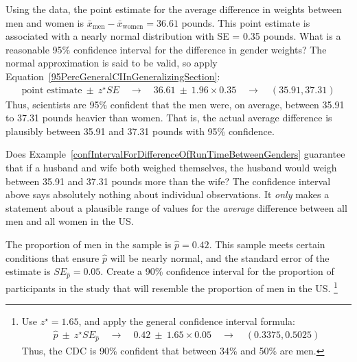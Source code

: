 \begin{example}{Using the  data, the point estimate for the average difference in weights between men and women is $\bar{x}_\mathrm{{men}}-\bar{x}_\mathrm{{women}}= 36.61$ pounds. This point estimate is associated with a nearly normal distribution with SE = 0.35 pounds. What is a reasonable 95\% confidence interval for the difference in gender weights?}
\label{confIntervalForDifferenceOfRunTimeBetweenGenders}
The normal approximation is said to be valid, so apply Equation~\eqref{95PercGeneralCIInGeneralizingSection}:
\begin{eqnarray*}
\text{point estimate}\ \pm\ z^{\star} SE
	\quad\rightarrow\quad 36.61\ \pm\ 1.96\times 0.35
	\quad\rightarrow\quad (35.91, 37.31)
\end{eqnarray*}
Thus, scientists are 95\% confident that the men were, on average, between 35.91 to 37.31 pounds heavier than women. That is, the actual average difference is plausibly between 35.91 and 37.31 pounds with 95\% confidence.
\end{example}

\begin{example}{Does Example~\ref{confIntervalForDifferenceOfRunTimeBetweenGenders} guarantee that if a husband and wife both weighed themselves, the husband would weigh between 35.91 and 37.31 pounds more than the wife?}
The confidence interval above says absolutely nothing about individual observations. It \emph{only} makes a statement about a plausible range of values for the \emph{average} difference between all men and all women in the US. 
\end{example}

\begin{exercise}
The proportion of men in the  sample is $\hat{p}=0.42$. This sample meets certain conditions that ensure $\hat{p}$ will be nearly normal, and the standard error of the estimate is $SE_{\hat{p}}=0.05$. Create a 90\% confidence interval for the proportion of participants in the  study that will resemble the proportion of men in the US. \footnote{Use $z^{\star}=1.65$, and apply the general confidence interval formula:
\begin{eqnarray*}
\hat{p}\ \pm\ z^{\star}SE_{\hat{p}}
	\quad\to\quad 0.42\ \pm\ 1.65\times 0.05
	\quad\to\quad (0.3375, 0.5025)
\end{eqnarray*}
Thus, the CDC is 90\% confident that between 34\% and 50\% are men.}
\end{exercise}

